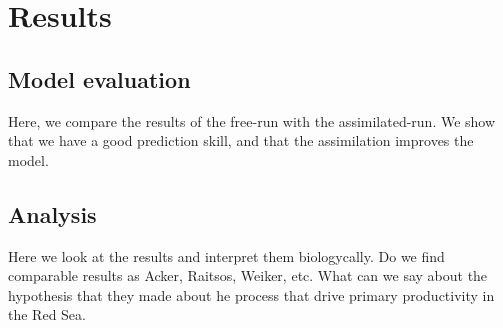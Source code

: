 \section{Results}

\subsection{Model evaluation}

Here, we compare the results of the free-run with the assimilated-run.
We show that we have a good prediction skill, and that the assimilation
improves the model.

\subsection{Analysis}

Here we look at the results and interpret them biologycally. Do we find
comparable results as Acker, Raitsos, Weiker, etc. What can we say about the
hypothesis that they made about he process that drive primary productivity in
the Red Sea.

